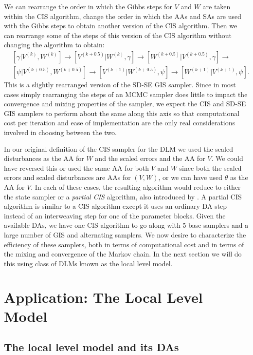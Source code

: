 \documentclass[12pt]{article}
\begin{document}
We can rearrange the order in which the Gibbs steps for $V$ and $W$ are taken within the CIS algorithm, change the order in which the AAs and SAs are used with the Gibbs steps to obtain another version of the CIS algorithm. Then we can rearrange some of the steps of this version of the CIS algorithm without changing the algorithm to obtain:
\begin{align*}
&[\gamma|V^{(k)},W^{(k)}] \to [V^{(k+0.5)}|W^{(k)},\gamma] \to[W^{(k+0.5)}|V^{(k+0.5)},\gamma] \to \\
&[\psi|V^{(k+0.5)},W^{(k+0.5)}]\to [V^{(k+1)}|W^{(k+0.5)},\psi]\to [W^{(k+1)}|V^{(k+1)},\psi].
\end{align*}
This is a slightly rearranged version of the SD-SE GIS sampler. Since in most cases simply rearranging the steps of an MCMC sampler does little to impact the convergence and mixing properties of the sampler, we expect the CIS and SD-SE GIS samplers to perform about the same along this axis so that computational cost per iteration and ease of implementation are the only real considerations involved in choosing between the two.

In our original definition of the CIS sampler for the DLM we used the scaled disturbances as the AA for $W$ and the scaled errors and the AA for $V$. We could have reversed this or used the same AA for both $V$ and $W$ since both the scaled errors and scaled disturbances are AAs for $(V,W)$, or we can have used $\theta$ as the AA for $V$. In each of these cases, the resulting algorithm would reduce to either the state sampler or a {\it partial CIS} algorithm, also introduced by \citet{yu2011center}. A partial CIS algorithm is similar to a CIS algorithm except it uses an ordinary DA step instead of an interweaving step for one of the parameter blocks. Given the available DAs, we have one CIS algorithm to go along with 5 base samplers and a large number of GIS and alternating samplers. We now desire to characterize the efficiency of these samplers, both in terms of computational cost and in terms of the mixing and convergence of the Markov chain. In the next section we will do this using class of DLMs known as the local level model.

\section{Application: The Local Level Model}\label{sec:LLM}

\subsection{The local level model and its DAs}
\end{document}
